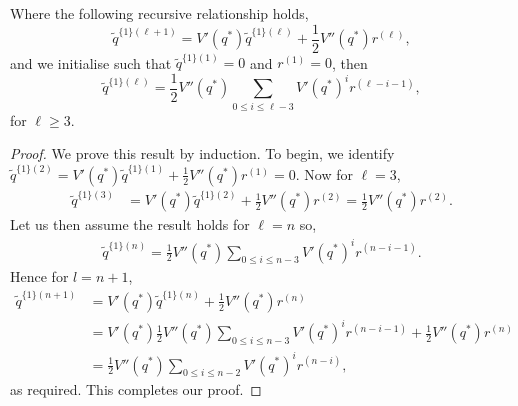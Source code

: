\documentclass[10pt,a4paper]{amsart}
\begin{document}
\begin{lemma}
    \label{lem:app_nlo_eq}
    Where the following recursive relationship holds,
    \begin{equation}
        \tilde{q}^{\{1\}(\ell+1)} =  V' \left( q^{*}\right) \tilde{q}^{\{1\}(\ell)} + \frac{1}{2} V''\left( q^{*}\right) r^{(\ell)},
    \end{equation}
    and we initialise such that $\tilde{q}^{\{1\}(1)}= 0$ and $r^{(1)}=0$, then
    \begin{equation}
        \tilde{q}^{\{1\}(\ell)} = \frac{1}{2}V''\left( q^{*}\right) \sum_{0\leq i \leq \ell-3} V' \left( q^{*} \right)^i r^{(\ell-i-1)},
    \end{equation}
    for $\ell\geq 3$.
\end{lemma}

\begin{proof}
    We prove this result by induction. To begin, we identify $\tilde{q}^{\{1\}(2)}= V' \left( q^{*}\right) \tilde{q}^{\{1\}(1)} + \frac{1}{2} V''\left( q^{*}\right) r^{(1)} =0 $. Now for $\ell=3$,
\begin{align}
    \tilde{q}^{\{1\}(3)} &=V' \left( q^{*}\right) \tilde{q}^{\{1\}(2)} + \frac{1}{2} V''\left( q^{*}\right) r^{(2)} = \frac{1}{2} V''\left( q^{*}\right) r^{(2)}.
\end{align}
Let us then assume the result holds for $\ell=n$ so,
\begin{align}
    \tilde{q}^{\{1\}(n)} = \frac{1}{2}V''\left( q^{*}\right) \sum_{0\leq i \leq n-3} V' \left( q^{*} \right)^i r^{(n-i-1)}.
\end{align}
Hence for $l=n+1$,
\begin{align}
    \tilde{q}^{\{1\}(n+1)} &=  V' \left( q^{*}\right) \tilde{q}^{\{1\}(n)} + \frac{1}{2} V''\left( q^{*}\right) r^{(n)} \\
    &=  V' \left( q^{*}\right)  \frac{1}{2}V''\left( q^{*}\right) \sum_{0\leq i \leq n-3} V' \left( q^{*} \right)^i r^{(n-i-1)}  + \frac{1}{2} V''\left( q^{*}\right) r^{(n)} \\
    &=  \frac{1}{2}V''\left( q^{*}\right) \sum_{0\leq i \leq n-2} V' \left( q^{*} \right)^i r^{(n-i)},
\end{align}
as required. This completes our proof.
\end{proof}
\end{document}
